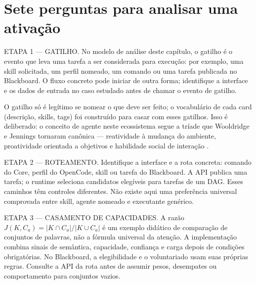 \section{Sete perguntas para analisar uma ativação}

\begin{processo}
ETAPA 1 — GATILHO. No modelo de análise deste capítulo, o gatilho é o evento que
leva uma tarefa a ser considerada para execução: por exemplo, uma skill
solicitada, um perfil nomeado, um comando ou uma tarefa publicada no Blackboard.
O fluxo concreto pode iniciar de outra forma; identifique a interface e os dados
de entrada no caso estudado antes de chamar o evento de gatilho.
\end{processo}

O gatilho só é legítimo se nomear o que deve ser feito; o vocabulário de
cada card (descrição, skills, tags) foi construído para casar com esses
gatilhos. Isso é deliberado: o conceito de agente neste ecossistema segue a
tríade que Wooldridge e Jennings tornaram canônica — reatividade à mudança do
ambiente, proatividade orientada a objetivos e habilidade social de
interação .\begin{processo}
ETAPA 2 — ROTEAMENTO. Identifique a interface e a rota concreta: comando
do Core, perfil do OpenCode, skill ou tarefa do Blackboard. A API
 publica uma tarefa; o runtime
 seleciona candidatos elegíveis para tarefas de um DAG.
Esses caminhos têm controles diferentes. Não existe aqui uma preferência
universal comprovada entre skill, agente nomeado e executante genérico.
\end{processo}

\begin{processo}
ETAPA 3 — CASAMENTO DE CAPACIDADES. A razão
$J(K,C_a)=|K\cap C_a|/|K\cup C_a|$ é um exemplo didático de comparação de
conjuntos de palavras, não a fórmula universal da atenção. A implementação
 combina sinais de semântica, capacidade, confiança e
carga depois de condições obrigatórias. No Blackboard, a elegibilidade e o
voluntariado usam suas próprias regras. Consulte a API da rota antes de
assumir pesos, desempates ou comportamento para conjuntos vazios.
\end{processo}

